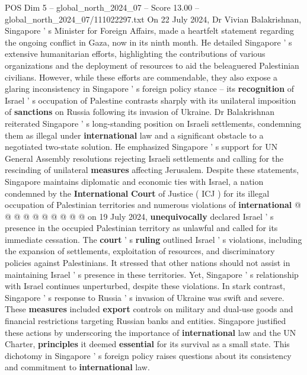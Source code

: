 \begin{textsample}{POS Dim 5 – global\_north\_2024\_07 – Score 13.00 – global\_north\_2024\_07/111022297.txt}  \label{ex:f5_pos_308}
On 22 July 2024, Dr Vivian Balakrishnan, Singapore ' s Minister for Foreign Affairs, made a heartfelt statement regarding the ongoing conflict in Gaza, now in its ninth month.
He detailed Singapore ' s extensive humanitarian efforts, highlighting the contributions of various organizations and the deployment of resources to aid the beleaguered Palestinian civilians.
However, while these efforts are commendable, they also expose a glaring inconsistency in Singapore ' s foreign policy stance -- its \textbf{recognition} of Israel ' s occupation of Palestine contrasts sharply with its unilateral imposition of \textbf{sanctions} on Russia following its invasion of Ukraine.
Dr Balakrishnan reiterated Singapore ' s long-standing position on Israeli settlements, condemning them as illegal under \textbf{international} law and a significant obstacle to a negotiated two-state solution.
He emphasized Singapore ' s support for UN General Assembly resolutions rejecting Israeli settlements and calling for the rescinding of unilateral \textbf{measures} affecting Jerusalem.
Despite these statements, Singapore maintains diplomatic and economic ties with Israel, a nation condemned by the \textbf{International} \textbf{Court} of Justice ( ICJ ) for its illegal occupation of Palestinian territories and numerous violations of \textbf{international} @ @ @ @ @ @ @ @ @ @ on 19 July 2024, \textbf{unequivocally} declared Israel ' s presence in the occupied Palestinian territory as unlawful and called for its immediate cessation.
The \textbf{court} ' s \textbf{ruling} outlined Israel ' s violations, including the expansion of settlements, exploitation of resources, and discriminatory policies against Palestinians.
It stressed that other nations should not assist in maintaining Israel ' s presence in these territories.
Yet, Singapore ' s relationship with Israel continues unperturbed, despite these violations.
In stark contrast, Singapore ' s response to Russia ' s invasion of Ukraine was swift and severe.
These \textbf{measures} included \textbf{export} controls on military and dual-use goods and financial restrictions targeting Russian banks and entities.
Singapore justified these actions by underscoring the importance of \textbf{international} law and the UN Charter, \textbf{principles} it deemed \textbf{essential} for its survival as a small state.
This dichotomy in Singapore ' s foreign policy raises questions about its consistency and commitment to \textbf{international} law.

\end{textsample}
